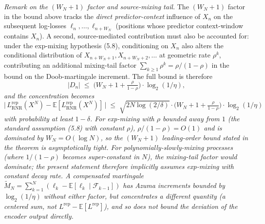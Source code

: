 \documentclass[
]{article}
\begin{document}
\emph{Remark on the $(W_N+1)$ factor and source-mixing tail.}
The $(W_N+1)$ factor in the bound above tracks the
\emph{direct predictor-context} influence of $X_n$ on the
subsequent log-losses $\ell_n, \ldots, \ell_{n+W_N}$ (positions whose
predictor context-window contains $X_n$). A second, source-mediated
contribution must also be accounted for: under the exp-mixing
hypothesis (5.8), conditioning on $X_n$ also alters the conditional
distribution of $X_{n+W_N+1}, X_{n+W_N+2}, \ldots$ at geometric rate
$\rho^k$, contributing an additional mixing-tail factor
$\sum_{k \geq 1} \rho^k = \rho/(1-\rho)$ in the bound on the
Doob-martingale increment. The full bound is therefore
\[
|D_n| \;\leq\; \bigl(W_N + 1 + \tfrac{\rho}{1-\rho}\bigr)
\cdot \log_2(1/\eta),
\]
\emph{and the concentration becomes}
\[
\bigl|\,L^{\mathrm{rep}}_{\mathrm{RNR}}(X^N) - \mathbb{E}[L^{\mathrm{rep}}_{\mathrm{RNR}}(X^N)]\,\bigr|
\;\leq\;
\sqrt{2 N \log(2/\delta)} \cdot \bigl(W_N + 1 + \tfrac{\rho}{1-\rho}\bigr)
\cdot \log_2(1/\eta)
\]
\emph{with probability at least $1 - \delta$. For exp-mixing with
$\rho$ bounded away from $1$ (the standard assumption (5.8) with
constant $\rho$), $\rho/(1-\rho) = O(1)$ and is dominated by
$W_N = O(\log N)$, so the $(W_N+1)$ leading-order bound stated in
the theorem is asymptotically tight. For polynomially-slowly-mixing
processes (where $1/(1-\rho)$ becomes super-constant in $N$), the
mixing-tail factor would dominate; the present statement therefore
implicitly assumes exp-mixing with constant decay rate. A compensated
martingale $\tilde{M}_N = \sum_{k=1}^N (\ell_k - \mathbb{E}[\ell_k
\mid \mathcal{F}_{k-1}])$ has Azuma increments bounded by
$\log_2(1/\eta)$ without either factor, but concentrates a different
quantity (a centered sum, not $L^{\mathrm{rep}} -
\mathbb{E}[L^{\mathrm{rep}}]$), and so does not bound the deviation
of the encoder output directly.}
\end{document}
